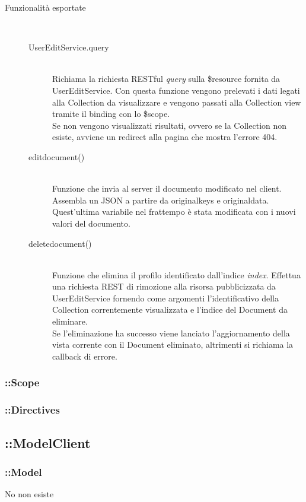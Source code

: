 \begin{description}
 \item[Funzionalità esportate] \hfill \\
 \begin{description}
  \item[UserEditService.query] \hfill \\
 Richiama la richiesta RESTful \textit{query} sulla \$resource fornita da UserEditService.
  Con questa funzione vengono prelevati i dati legati alla Collection da visualizzare e vengono
  passati alla Collection view tramite il binding con lo \$scope. \\
  Se non vengono visualizzati risultati, ovvero se la Collection non esiste, avviene un redirect alla pagina
  che mostra l'errore 404.
  \item[edit\textunderscore document()] \hfill \\
  Funzione che invia al server il documento modificato nel client.
  Assembla un JSON a partire da original\textunderscore keys e original\textunderscore data. Quest'ultima variabile nel frattempo è stata 
  modificata con i nuovi valori del documento.
  \item[delete\textunderscore document()] \hfill \\
 Funzione che elimina il profilo identificato dall'indice \emph{index}. Effettua una richiesta REST di rimozione alla risorsa
  pubblicizzata da UserEditService fornendo come argomenti l'identificativo della Collection correntemente visualizzata e l'indice
  del Document da eliminare. \\
  Se l'eliminazione ha successo viene lanciato l'aggiornamento della vista corrente con il Document eliminato, altrimenti si
  richiama la callback di errore.
 \end{description}
\end{description}

\subsubsection{::Scope}

\subsubsection{::Directives}

\subsection{::ModelClient}

\subsubsection{::Model}
No non esiste
